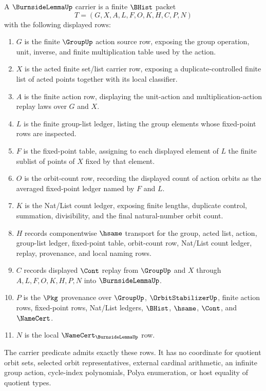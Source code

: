\begin{definition}
\label{def:burnside-lemma-carrier}
A $\BurnsideLemmaUp$ carrier is a finite $\BHist$ packet
$$
T=(G,X,A,L,F,O,K,H,C,P,N)
$$
with the following displayed rows:
\begin{enumerate}
\item $G$ is the finite $\GroupUp$ action source row, exposing the group operation, unit, inverse, and finite multiplication table used by the action.
\item $X$ is the acted finite set/list carrier row, exposing a duplicate-controlled finite list of acted points together with its local classifier.
\item $A$ is the finite action row, displaying the unit-action and multiplication-action replay laws over $G$ and $X$.
\item $L$ is the finite group-list ledger, listing the group elements whose fixed-point rows are inspected.
\item $F$ is the fixed-point table, assigning to each displayed element of $L$ the finite sublist of points of $X$ fixed by that element.
\item $O$ is the orbit-count row, recording the displayed count of action orbits as the averaged fixed-point ledger named by $F$ and $L$.
\item $K$ is the Nat/List count ledger, exposing finite lengths, duplicate control, summation, divisibility, and the final natural-number orbit count.
\item $H$ records componentwise $\hsame$ transport for the group, acted list, action, group-list ledger, fixed-point table, orbit-count row, Nat/List count ledger, replay, provenance, and local naming rows.
\item $C$ records displayed $\Cont$ replay from $\GroupUp$ and $X$ through $A,L,F,O,K,H,P,N$ into $\BurnsideLemmaUp$.
\item $P$ is the $\Pkg$ provenance over $\GroupUp$, $\OrbitStabilizerUp$, finite action rows, fixed-point rows, Nat/List ledgers, $\BHist$, $\hsame$, $\Cont$, and $\NameCert$.
\item $N$ is the local $\NameCert_{\BurnsideLemmaUp}$ row.
\end{enumerate}
The carrier predicate admits exactly these rows. It has no coordinate for quotient orbit sets, selected orbit representatives, external cardinal arithmetic, an infinite group action, cycle-index polynomials, Polya enumeration, or host equality of quotient types.
\end{definition}

